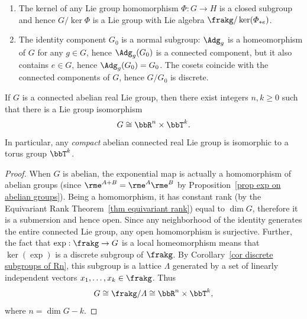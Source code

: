 \begin{example}\label{example kernel subgroup}
    \begin{enumerate}
        \item The kernel of any Lie group homomorphism $\varPhi:G\to H$ is a closed subgroup and hence $G\slash \ker\varPhi$ is a Lie group with Lie algebra $\frakg\slash\ker(\varPhi_{\ast e})$.
        \item The identity component $G_0$ is a normal subgroup: $\Adg_g$ is a homeomorphism of $G$ for any $g\in G$, hence $\Adg_g(G_0)$ is a connected component, but it also contains $e\in G$, hence $\Adg_g(G_0)=G_0$. The cosets coincide with the connected components of $G$, hence $G\slash G_0$ is discrete.
    \end{enumerate}
\end{example}



\begin{cor}\label{cor structure of abelian Lie groups}
    If $G$ is a connected abelian real Lie group, then there exist integers $n,k\geq 0$ such that there is a Lie group isomorphism
    \[G\cong \bbR^n\times \bbT^k.\]
    In particular, any \emph{compact} abelian connected real Lie group is isomorphic to a torus group $\bbT^k$.
\end{cor}
\begin{proof}
    When $G$ is abelian, the exponential map is actually a homomorphism of abelian groups (since $\rme^{A+B}=\rme^A\rme^B$ by Proposition~\ref{prop exp on abelian groups}). Being a homomorphism, it has constant rank (by the Equivariant Rank Theorem~\ref{thm equivariant rank}) equal to $\dim G$, therefore it is a submersion and hence open. Since any neighborhood of the identity generates the entire connected Lie group, any open homomorphism is surjective. Further, the fact that $\exp:\frakg\to G$ is a local homeomorphism means that $\ker(\exp)$ is a discrete subgroup of $\frakg$. By Corollary~\ref{cor discrete subgroups of Rn}, this subgroup is a lattice $\varLambda$ generated by a set of linearly independent vectors $x_1,\ldots,x_k\in\frakg$. Thus
    \[G\cong \frakg\slash \varLambda\cong \bbR^n\times \bbT^k,\]
    where $n=\dim G-k$.
\end{proof}


